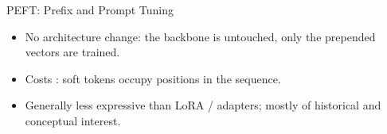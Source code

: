 \begin{frame}{PEFT: Prefix and Prompt Tuning}
  \vspace{0.4em}
  \begin{itemize}[nosep]
    \item No architecture change: the backbone is untouched, only the prepended vectors are trained.
    \item Costs : soft tokens occupy positions in the sequence.
    \item Generally less expressive than LoRA / adapters; mostly of historical and conceptual interest.
  \end{itemize}
\end{frame}
